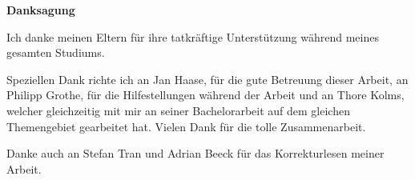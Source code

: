 \thispagestyle{empty}


\vspace*{6cm}
{\Huge \textbf{Danksagung} }
\vspace*{1cm}

Ich danke meinen Eltern für ihre tatkräftige Unterstützung während meines gesamten Studiums.

Speziellen Dank richte ich an Jan Haase, für die gute Betreuung dieser Arbeit, an Philipp Grothe, für die Hilfestellungen während der Arbeit und an Thore Kolms, welcher gleichzeitig mit mir an seiner Bachelorarbeit auf dem gleichen Themengebiet gearbeitet hat. Vielen Dank für die tolle Zusammenarbeit.

Danke auch an Stefan Tran und Adrian Beeck für das Korrekturlesen meiner Arbeit.
